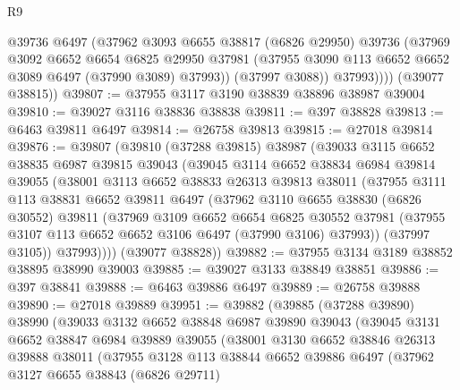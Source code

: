\begin{lexlean}{R9}
\begin{coremodule}
              @39736
              @6497
              (@37962
                @3093
                @6655
                @38817
                (@6826 @29950)
                @39736
                (@37969
                  @3092
                  @6652
                  @6654
                  @6825
                  @29950
                  @37981
                  (@37955 @3090 @113 @6652 @6652 @3089 @6497 (@37990 @3089) @37993))
                (@37997 @3088))
              @37993))))
      (@39077 @38815))
@39807 := @37955 @3117 @3190 @38839 @38896 @38987 @39004
@39810 := @39027 @3116 @38836 @38838
@39811 := @397 @38828
@39813 := @6463 @39811 @6497
@39814 := @26758 @39813
@39815 := @27018 @39814
@39876 := @39807
    (@39810
      (@37288 @39815)
      @38987
      (@39033
        @3115
        @6652
        @38835
        @6987
        @39815
        @39043
        (@39045
          @3114
          @6652
          @38834
          @6984
          @39814
          @39055
          (@38001
            @3113
            @6652
            @38833
            @26313
            @39813
            @38011
            (@37955
              @3111
              @113
              @38831
              @6652
              @39811
              @6497
              (@37962
                @3110
                @6655
                @38830
                (@6826 @30552)
                @39811
                (@37969
                  @3109
                  @6652
                  @6654
                  @6825
                  @30552
                  @37981
                  (@37955 @3107 @113 @6652 @6652 @3106 @6497 (@37990 @3106) @37993))
                (@37997 @3105))
              @37993))))
      (@39077 @38828))
@39882 := @37955 @3134 @3189 @38852 @38895 @38990 @39003
@39885 := @39027 @3133 @38849 @38851
@39886 := @397 @38841
@39888 := @6463 @39886 @6497
@39889 := @26758 @39888
@39890 := @27018 @39889
@39951 := @39882
    (@39885
      (@37288 @39890)
      @38990
      (@39033
        @3132
        @6652
        @38848
        @6987
        @39890
        @39043
        (@39045
          @3131
          @6652
          @38847
          @6984
          @39889
          @39055
          (@38001
            @3130
            @6652
            @38846
            @26313
            @39888
            @38011
            (@37955
              @3128
              @113
              @38844
              @6652
              @39886
              @6497
              (@37962
                @3127
                @6655
                @38843
                (@6826 @29711)

\end{coremodule}
\end{lexlean}

